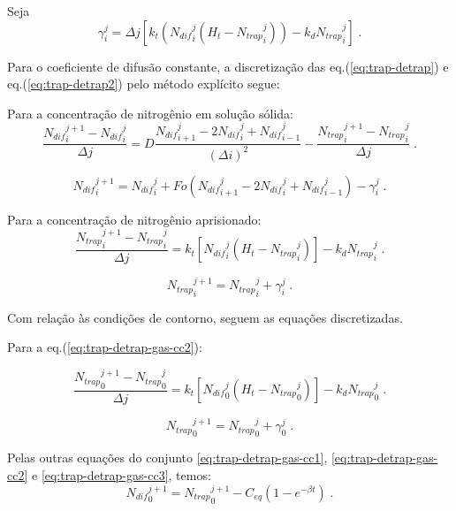 Seja 
\begin{equation*}
\gamma_i^j = {\Delta j}\left[k_t\left({N_{dif}}_{i}^{j} \left(H_t-{N_{trap}}_{i}^{j}\right)\right) - k_d{N_{trap}}_i^{j}\right] \;.
\end{equation*}

Para o coeficiente de difusão constante, a discretização das eq.(\ref{eq:trap-detrap}) e eq.(\ref{eq:trap-detrap2}) pelo método explícito segue:

Para a concentração de nitrogênio em solução sólida:
\begin{equation*}
\dfrac{{N_{dif}}_{i}^{j+1} - {N_{dif}}_{i}^{j}}{\Delta j} = D \dfrac{{N_{dif}}_{i+1}^{j} - 2{N_{dif}}_i^{j} + {N_{dif}}_{i-1}^{j}}{(\Delta i)^2} - \dfrac{{N_{trap}}_i^{j+1} - {N_{trap}}_{i}^{j}}{\Delta j} \;.
\end{equation*} 

\begin{equation}
\label{eq:trap-detrap-discr2}
{N_{dif}}_{i}^{j+1} = {N_{dif}}_{i}^{j} + Fo({N_{dif}}_{i+1}^{j} - 2{N_{dif}}_i^{j} + {N_{dif}}_{i-1}^{j}) - \gamma_i^j \;.
\end{equation} 


Para a concentração de nitrogênio aprisionado:
\begin{equation*}
\dfrac{{N_{trap}}_i^{j+1} - {N_{trap}}_{i}^{j}}{\Delta j} = k_t\left[{N_{dif}}_{i}^{j} \left(H_t-{N_{trap}}_{i}^{j}\right)\right] - k_d{N_{trap}}_i^{j}  \;.
\end{equation*}


\begin{equation}
\label{eq:trap-detrap2-discr2}
{N_{trap}}_i^{j+1} = {N_{trap}}_{i}^{j} + \gamma_i^j  \;.
\end{equation}

Com relação às condições de contorno, seguem as equações discretizadas.

Para a eq.(\ref{eq:trap-detrap-gas-cc2}):

\begin{equation*}
\dfrac{{N_{trap}}_0^{j+1} - {N_{trap}}_{0}^{j}}{\Delta j} = k_t\left[{N_{dif}}_{0}^{j} \left(H_t-{N_{trap}}_{0}^{j}\right)\right] - k_d{N_{trap}}_0^{j}  \;.
\end{equation*} 

\begin{equation}
\label{eq:trap-detrap2-discr3}
{N_{trap}}_0^{j+1} = {N_{trap}}_{0}^{j} + \gamma_0^j  \;.
\end{equation}

Pelas outras equações do conjunto \ref{eq:trap-detrap-gas-cc1}, \ref{eq:trap-detrap-gas-cc2} e \ref{eq:trap-detrap-gas-cc3}, temos:
\begin{equation}
\label{eq:trap-detrap2-discr4}
{N_{dif}}_0^{j+1} = {N_{trap}}_{0}^{j+1} - C_{eq}(1 - e^{-\beta t})  \;.
\end{equation}

